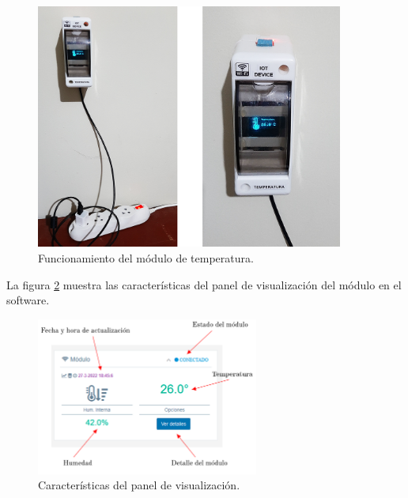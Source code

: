 \begin{figure}[htpb]
\centering 
\includegraphics[width=0.9\textwidth]{./Figures/test/temp/test-temp.png}
\caption{Funcionamiento del módulo de temperatura.}
\label{fig:test-temp}
\end{figure}

La figura \ref{fig:test-panel} muestra las características del panel de visualización del módulo en el software.

\begin{figure}[htpb]
\centering 
\includegraphics[width=0.65\textwidth]{./Figures/test/temp/panel.png}
\caption{Características del panel de visualización.}
\label{fig:test-panel}
\end{figure}


